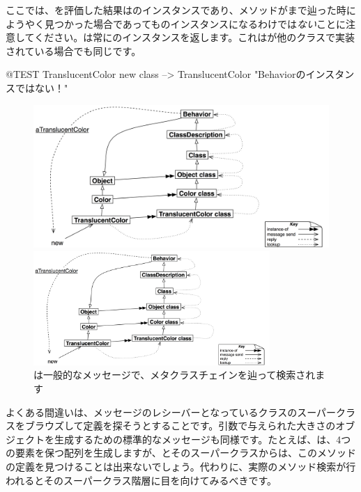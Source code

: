\documentclass[a4paper,10pt,twoside]{book}
\begin{document}
ここでは、を評価した結果はのインスタンスであり、メソッドがまで辿った時にようやく見つかった場合であってものインスタンスになるわけでは\emph{ない}ことに注意してください。は常に\self のインスタンスを返します。これはが他のクラスで実装されている場合でも同じです。

\begin{code}{@TEST}
TranslucentColor new class --> TranslucentColor    "Behaviorのインスタンスではない！"
\end{code}

\begin{center}
\begin{figure}
\ifluluelse
	{\centerline{\includegraphics[width=\textwidth]{TranslucentSendingNew}}}
	{\centerline{\includegraphics[width=0.8\textwidth]{TranslucentSendingNew}}}
\caption{は一般的なメッセージで、メタクラスチェインを辿って検索されます}
\end{figure}
\end{center}

よくある間違いは、メッセージのレシーバーとなっているクラスのスーパークラスをブラウズして定義を探そうとすることです。引数で与えられた大きさのオブジェクトを生成するための標準的なメッセージも同様です。たとえば、は、4つの要素を保つ配列を生成しますが、とそのスーパークラスからは、このメソッドの定義を見つけることは出来ないでしょう。代わりに、実際のメソッド検索が行われるとそのスーパークラス階層に目を向けてみるべきです。
\end{document}
